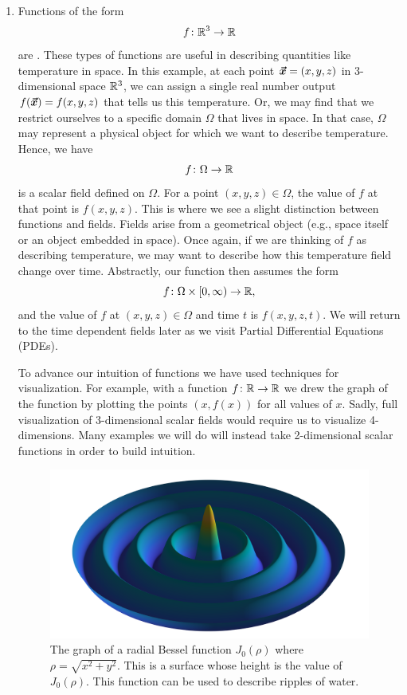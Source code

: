 \begin{enumerate}[(1)]
        \item Functions of the form
        \[
        f\colon \mathbb{R}^3 \to \mathbb{R}
        \]
        are . These types of functions are useful in describing quantities like temperature in space. In this example, at each point $\boldsymbol{\vec{x}}=(x,y,z)$ in 3-dimensional space $\mathbb{R}^3$, we can assign a single real number output $f(\boldsymbol{\vec{x}})=f(x,y,z)$ that tells us this temperature. Or, we may find that we restrict ourselves to a specific domain $\Omega$ that lives in space. In that case, $\Omega$ may represent a physical object for which we want to describe temperature. Hence, we have
        \[
        f \colon \Omega \to \mathbb{R}
        \] 
        is a scalar field defined on $\Omega$. For a point $(x,y,z) \in \Omega$, the value of $f$ at that point is $f(x,y,z)$. This is where we see a slight distinction between functions and fields. Fields arise from a geometrical object (e.g., space itself or an object embedded in space). Once again, if we are thinking of $f$ as describing temperature, we may want to describe how this temperature field change over time. Abstractly, our function then assumes the form
        \[
        f \colon \Omega \times [0,\infty) \to \mathbb{R},
        \]
        and the value of $f$ at $(x,y,z) \in \Omega$ and time $t$ is $f(x,y,z,t)$. We will return to the time dependent fields later as we visit Partial Differential Equations (PDEs).

        To advance our intuition of functions we have used techniques for visualization. For example, with a function $f \colon \mathbb{R} \to \mathbb{R}$ we drew the graph of the function by plotting the points $(x,f(x))$ for all values of $x$. Sadly, full visualization of 3-dimensional scalar fields would require us to visualize 4-dimensions. Many examples we will do will instead take 2-dimensional scalar functions in order to build intuition.

        \begin{figure}[H]
            \centering
            \includegraphics[width=.8\textwidth]{Figures_Part_5/bessel_surface.png}
            \caption{The graph of a radial Bessel function $J_0(\rho)$ where $\rho = \sqrt{x^2+y^2}$. This is a surface whose height is the value of $J_0(\rho)$. This function can be used to describe ripples of water.}
        \end{figure}
        

\end{enumerate}
